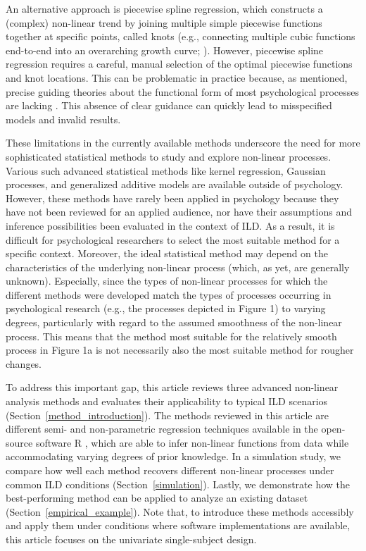 \documentclass[man, floatsintext]{apa7}
\begin{document}
An alternative approach is piecewise spline regression, which constructs a
(complex) non-linear trend by joining multiple simple piecewise functions
together at specific points, called knots (e.g., connecting multiple cubic
functions end-to-end into an overarching growth curve;
\textcite{tsay_nonlinear_2019}). However, piecewise spline regression requires
a careful, manual selection of the optimal piecewise functions and knot
locations. This can be problematic in practice because, as mentioned, precise
guiding theories about the functional form of most psychological processes are
lacking \parencite{tan_time-varying_2011}. This absence of clear guidance can
quickly lead to misspecified models and invalid results.

These limitations in the currently available methods underscore the need for
more sophisticated statistical methods to study and explore non-linear
processes. Various such advanced statistical methods like kernel regression,
Gaussian processes, and generalized additive models are available outside of
psychology. However, these methods have rarely been applied in psychology
because they have not been reviewed for an applied audience, nor have their
assumptions and inference possibilities been evaluated in the context of ILD\@.
As a result, it is difficult for psychological researchers to select the most
suitable method for a specific context. Moreover, the ideal statistical method
may depend on the characteristics of the underlying non-linear process (which,
as yet,  are generally unknown). Especially, since the types of non-linear
processes for which the different methods were developed match the types of
processes occurring in psychological research (e.g., the processes depicted in
Figure 1) to varying degrees, particularly with regard to the assumed
smoothness of the non-linear process. This means that the method most suitable
for the relatively smooth process in Figure 1a is not necessarily also the most
suitable method for rougher changes.

To address this important gap, this article reviews three advanced non-linear
analysis methods and evaluates their applicability to typical ILD scenarios
(Section~\ref{method_introduction}). The methods reviewed in this article are
different semi- and non-parametric regression techniques available in the
open-source software R \parencite{R-base}, which are able to infer non-linear
functions from data while accommodating varying degrees of prior knowledge. In
a simulation study, we compare how well each method recovers different
non-linear processes under common ILD conditions (Section~\ref{simulation}).
Lastly, we demonstrate how the best-performing method can be applied to analyze
an existing dataset (Section~\ref{empirical_example}). Note that, to introduce
these methods accessibly and apply them under conditions where software
implementations are available, this article focuses on the univariate
single-subject design.
\end{document}
